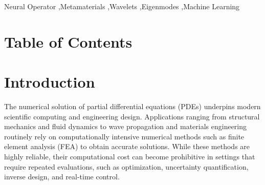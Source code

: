 \documentclass[preprint,review,12pt,numafflabel]{elsarticle}
\begin{document}
\begin{frontmatter}


\begin{keyword}
Neural Operator \sep Metamaterials \sep Wavelets \sep Eigenmodes \sep Machine Learning


\end{keyword}

\end{frontmatter}



\newpage
\section*{Table of Contents}
\begingroup
  \renewcommand{\contentsname}{}
  \tableofcontents
\endgroup
\newpage
\section{Introduction}
\label{introduction}

The numerical solution of partial differential equations (PDEs) underpins modern scientific computing and engineering design. Applications ranging from structural mechanics and fluid dynamics to wave propagation and materials engineering routinely rely on computationally intensive numerical methods such as finite element analysis (FEA) to obtain accurate solutions. While these methods are highly reliable, their computational cost can become prohibitive in settings that require repeated evaluations, such as optimization, uncertainty quantification, inverse design, and real-time control.
\end{document}
